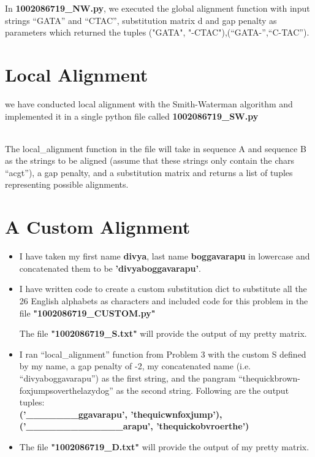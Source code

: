 \documentclass{article}
\begin{document}
In \textbf{1002086719\_NW.py}, we executed the global alignment function with input strings “GATA”
and “CTAC”, substitution matrix d and gap penalty as parameters which returned the tuples ("GATA", "-CTAC"),(“GATA-”,“C-TAC”).








\section {Local Alignment}
we have conducted local alignment with the Smith-Waterman algorithm and
implemented it in a single python file
called \textbf{1002086719\_SW.py}
           
\\

The local\_alignment function in the file will take in
sequence A and sequence B as the strings to be aligned (assume that these
strings only contain the chars “acgt”), a gap penalty, and a
substitution matrix and returns a list of tuples representing possible
alignments.

\section{A Custom Alignment }
\begin{itemize}
  \item I have taken my first name \textbf{divya}, last name \textbf{boggavarapu} in lowercase and concatenated them to be \textbf{'divyaboggavarapu'}.
  \item I have written code to create a custom substitution dict to substitute all the 26 English alphabets as characters and included code for this problem in the file \textbf{"1002086719\_CUSTOM.py"}
  
  The file \textbf{"1002086719\_S.txt"} will provide the output of my pretty matrix.
  
  \item I ran “local\_alignment” function from Problem 3 with the custom S defined by my name, a gap penalty of -2, my concatenated name (i.e. “divyaboggavarapu”) as the first string, and the pangram “thequickbrown- foxjumpsoverthelazydog” as the second string. Following are the output tuples:
  \\
  
 \textbf{('\_\_\_\_\_\_\_ggavarapu', 'thequicwnfoxjump'), ('\_\_\_\_\_\_\_\_\_\_\_\_\_arapu', 'thequickobvroerthe')}

  
  \item The file \textbf{"1002086719\_D.txt"} will provide the output of my pretty matrix. 
\end{itemize}
\end{document}
